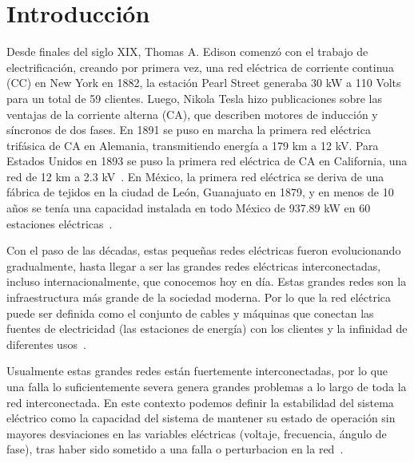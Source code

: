 
\chapter{Introducción}

Desde finales del siglo XIX, Thomas A. Edison comenzó con el trabajo de electrificación, creando por 
primera vez, una red eléctrica de corriente continua (CC) en New York en 1882, la estación Pearl Street 
generaba 30 kW a 110 Volts para un total de 59 clientes. Luego, Nikola Tesla hizo publicaciones sobre 
las ventajas de la corriente alterna (CA), que describen motores de inducción y síncronos de dos fases. 
En 1891 se puso en marcha la primera red eléctrica trifásica de CA en Alemania, transmitiendo energía a 
179 km a 12 kV. Para Estados Unidos en 1893 se puso la primera red eléctrica de CA en California, una 
red de 12 km a 2.3 kV~\cite{Glover2017}. En México, la primera red eléctrica se deriva de una fábrica 
de tejidos en la ciudad de León, Guanajuato en 1879, y en menos de 10 años se tenía una capacidad 
instalada en todo México de 937.89 kW en 60 estaciones eléctricas~\cite{Garza1994}.

Con el paso de las décadas, estas pequeñas redes eléctricas fueron evolucionando gradualmente, hasta 
llegar a ser las grandes redes eléctricas interconectadas, incluso internacionalmente, que conocemos 
hoy en día. Estas grandes redes son la infraestructura más grande de la sociedad moderna. Por lo que la 
red eléctrica puede ser definida como el conjunto de cables y máquinas que conectan las fuentes de 
electricidad (las estaciones de energía) con los clientes y la infinidad de diferentes 
usos~\cite{Amin2008}. 

Usualmente estas grandes redes están fuertemente interconectadas, por lo que una
falla lo suficientemente severa genera grandes problemas a lo largo de toda la red interconectada. 
En este contexto podemos definir la estabilidad del sistema eléctrico como la capacidad del sistema de 
mantener su estado de operación sin mayores desviaciones en las variables eléctricas (voltaje, 
frecuencia, ángulo de fase), tras haber sido sometido a una falla o perturbacion en la 
red~\cite{kundur1994, Kundur2004, Hatziargyriou2021}.

